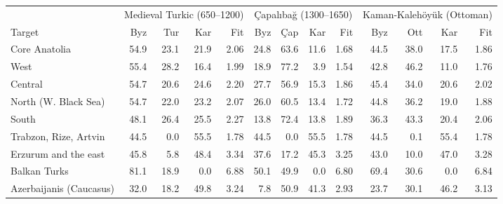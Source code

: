 \begin{tabular}{@{}l rrrr @{\hspace{10pt}} rrrr @{\hspace{10pt}} rrrr@{}}
\toprule
 & \multicolumn{4}{c}{Medieval Turkic (650--1200)} & \multicolumn{4}{c}{Çapalıbağ (1300--1650)} & \multicolumn{4}{c}{Kaman-Kalehöyük (Ottoman)} \\
\cmidrule(lr){2-5}\cmidrule(lr){6-9}\cmidrule(l){10-13}
Target & Byz & Tur & Kar & Fit & Byz & Çap & Kar & Fit & Byz & Ott & Kar & Fit \\
\midrule
Core Anatolia & 54.9 & 23.1 & 21.9 & 2.06 & 24.8 & 63.6 & 11.6 & 1.68 & 44.5 & 38.0 & 17.5 & 1.86 \\
West & 55.4 & 28.2 & 16.4 & 1.99 & 18.9 & 77.2 & 3.9 & 1.54 & 42.8 & 46.2 & 11.0 & 1.76 \\
Central & 54.7 & 20.6 & 24.6 & 2.20 & 27.7 & 56.9 & 15.3 & 1.86 & 45.4 & 34.0 & 20.6 & 2.02 \\
North (W. Black Sea) & 54.7 & 22.0 & 23.2 & 2.07 & 26.0 & 60.5 & 13.4 & 1.72 & 44.8 & 36.2 & 19.0 & 1.88 \\
South & 48.1 & 26.4 & 25.5 & 2.27 & 13.8 & 72.4 & 13.8 & 1.89 & 36.3 & 43.3 & 20.4 & 2.06 \\
Trabzon, Rize, Artvin & 44.5 & 0.0 & 55.5 & 1.78 & 44.5 & 0.0 & 55.5 & 1.78 & 44.5 & 0.1 & 55.4 & 1.78 \\
Erzurum and the east & 45.8 & 5.8 & 48.4 & 3.34 & 37.6 & 17.2 & 45.3 & 3.25 & 43.0 & 10.0 & 47.0 & 3.28 \\
Balkan Turks & 81.1 & 18.9 & 0.0 & 6.88 & 50.1 & 49.9 & 0.0 & 6.80 & 69.4 & 30.6 & 0.0 & 6.84 \\
Azerbaijanis (Caucasus) & 32.0 & 18.2 & 49.8 & 3.24 & 7.8 & 50.9 & 41.3 & 2.93 & 23.7 & 30.1 & 46.2 & 3.13 \\
\bottomrule
\end{tabular}
